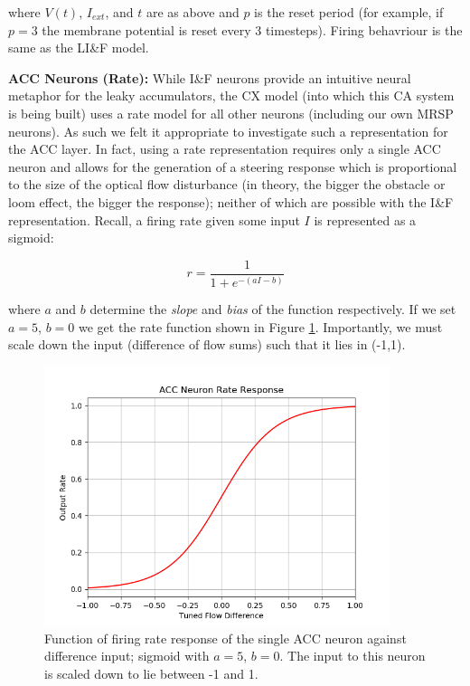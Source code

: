 \documentclass[a4paper,11pt,twoside,openright]{article}
\begin{document}
where $V(t)$, $I_{ext}$, and $t$ are as above and $p$ is the reset period (for
example, if $p = 3$ the membrane potential is reset every 3 timesteps). Firing
behavriour is the same as the LI\&F model.
\newline\par

\textbf{ACC Neurons (Rate):}
While I\&F neurons provide an intuitive neural metaphor for the leaky
accumulators, the CX model (into which this CA system is being built) uses
a rate model for all other neurons (including our own MRSP neurons). As such we
felt it appropriate to investigate such a representation for the ACC layer. In
fact, using a rate representation requires only a single ACC neuron and allows
for the generation of a steering response which is proportional to the size of
the optical flow disturbance (in theory, the bigger the obstacle or loom effect,
the bigger the response); neither of which are possible with the I\&F
representation. Recall, a firing rate given some input $I$ is represented as a
sigmoid:

\begin{equation*}
r = \frac{1}{1 + e^{-(aI - b)}}
\end{equation*}

where $a$ and $b$ determine the \textit{slope} and \textit{bias} of the function
respectively. If we set $a = 5$, $b = 0$ we get the rate function shown in Figure
\ref{fig:accrate}. Importantly, we must scale down the input (difference of flow
sums) such that it lies in (-1,1).\newline\par

\begin{figure}[h!]
  \centering
  \includegraphics[width=0.9\textwidth]{ACCRate}
  \caption{\label{fig:accrate} Function of firing rate response of the single ACC
    neuron against difference input; sigmoid with $a = 5$, $b = 0$. The input to
  this neuron is scaled down to lie between -1 and 1.}
\end{figure}
\end{document}

